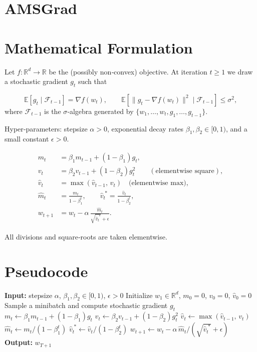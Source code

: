 \documentclass{article}
\newcommand{\E}{\mathbb{E}}
\newcommand{\R}{\mathbb{R}}
\begin{document}
\section*{AMSGrad}

\section*{Mathematical Formulation}
Let $f:\R^{d}\rightarrow\R$ be the (possibly non‑convex) objective.  
At iteration $t\ge 1$ we draw a stochastic gradient $g_{t}$ such that  

\[
\E[g_{t}\mid \mathcal{F}_{t-1}]=\nabla f(w_{t}),\qquad 
\E[\|g_{t}-\nabla f(w_{t})\|^{2}\mid \mathcal{F}_{t-1}]\le\sigma^{2},
\]
where $\mathcal{F}_{t-1}$ is the $\sigma$‑algebra generated by
$\{w_{1},\dots,w_{t},g_{1},\dots,g_{t-1}\}$.

Hyper‑parameters: stepsize $\alpha>0$, exponential decay rates
$\beta_{1},\beta_{2}\in[0,1)$, and a small constant $\epsilon>0$.

\[
\begin{aligned}
m_{t} &=\beta_{1}m_{t-1}+(1-\beta_{1})g_{t},
\\[2mm]
v_{t} &=\beta_{2}v_{t-1}+(1-\beta_{2})g_{t}^{2}\qquad (\text{elementwise square}),
\\[2mm]
\hat v_{t} &=\max (\hat v_{t-1},\,v_{t})\quad\text{(elementwise max)},
\\[2mm]
\hat m_{t}&=\frac{m_{t}}{1-\beta_{1}^{t}},\qquad 
\hat v_{t}^{\;*}= \frac{\hat v_{t}}{1-\beta_{2}^{t}},
\\[2mm]
w_{t+1}&=w_{t}-\alpha\,
\frac{\hat m_{t}}{\sqrt{\hat v_{t}^{\;*}}+\epsilon}.
\end{aligned}
\]

All divisions and square‑roots are taken elementwise.

\section*{Pseudocode}
\begin{algorithm}[H]
\caption{AMSGrad}
\begin{algorithmic}[1]
\State \textbf{Input:} stepsize $\alpha$, $\beta_{1},\beta_{2}\in[0,1)$, $\epsilon>0$
\State Initialize $w_{1}\in\R^{d}$, $m_{0}=0$, $v_{0}=0$, $\hat v_{0}=0$
    \State Sample a minibatch and compute stochastic gradient $g_{t}$
    \State $m_{t}\gets\beta_{1}m_{t-1}+(1-\beta_{1})g_{t}$
    \State $v_{t}\gets\beta_{2}v_{t-1}+(1-\beta_{2})g_{t}^{2}$
    \State $\hat v_{t}\gets\max(\hat v_{t-1},\,v_{t})$ 
    \State $\hat m_{t}\gets m_{t}/(1-\beta_{1}^{t})$
    \State $\hat v_{t}^{\;*}\gets \hat v_{t}/(1-\beta_{2}^{t})$
    \State $w_{t+1}\gets w_{t}-\alpha\,\hat m_{t}/(\sqrt{\hat v_{t}^{\;*}}+\epsilon)$
\EndFor
\State \textbf{Output:} $w_{T+1}$
\end{algorithmic}
\end{algorithm}
\end{document}
